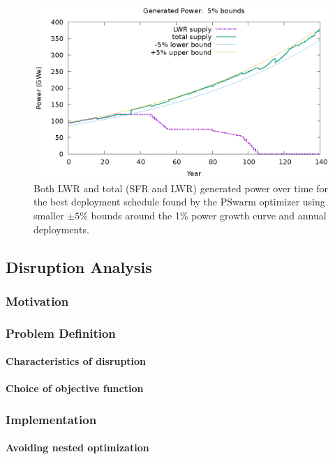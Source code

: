 \begin{figure}
    \centering
    \includegraphics[width=1.0\textwidth]{best-known-power.eps}
    \caption[Power for best build schedule with $\pm5\%$ bounds]{ Both
      \gls{LWR} and total (\gls{SFR} and \gls{LWR}) generated power over time
      for the best deployment schedule found by the PSwarm optimizer using
      smaller $\pm5\%$ bounds around the 1\% power growth curve and annual
      deployments.  }

    \label{fig:exp1-bestknownpower}
\end{figure}

\subsection{Disruption Analysis}
\subsubsection{Motivation}
\subsubsection{Problem Definition}
\paragraph{Characteristics of disruption}
\paragraph{Choice of objective function}
\subsubsection{Implementation}
\paragraph{Avoiding nested optimization}
\paragraph{}
